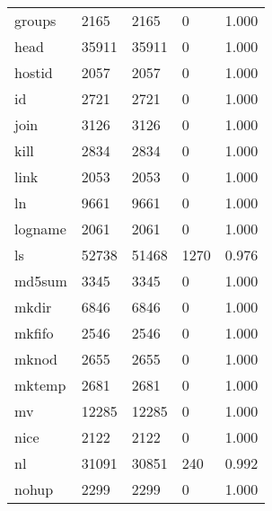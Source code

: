 \begin{longtable}{lp{3.0cm}p{3.0cm}p{3.0cm}p{3.0cm}}
groups    &                     2165 &         2165 &             0 &                    1.000 \\
head      &                    35911 &        35911 &             0 &                    1.000 \\
hostid    &                     2057 &         2057 &             0 &                    1.000 \\
id        &                     2721 &         2721 &             0 &                    1.000 \\
join      &                     3126 &         3126 &             0 &                    1.000 \\
kill      &                     2834 &         2834 &             0 &                    1.000 \\
link      &                     2053 &         2053 &             0 &                    1.000 \\
ln        &                     9661 &         9661 &             0 &                    1.000 \\
logname   &                     2061 &         2061 &             0 &                    1.000 \\
ls        &                    52738 &        51468 &          1270 &                    0.976 \\
md5sum    &                     3345 &         3345 &             0 &                    1.000 \\
mkdir     &                     6846 &         6846 &             0 &                    1.000 \\
mkfifo    &                     2546 &         2546 &             0 &                    1.000 \\
mknod     &                     2655 &         2655 &             0 &                    1.000 \\
mktemp    &                     2681 &         2681 &             0 &                    1.000 \\
mv        &                    12285 &        12285 &             0 &                    1.000 \\
nice      &                     2122 &         2122 &             0 &                    1.000 \\
nl        &                    31091 &        30851 &           240 &                    0.992 \\
nohup     &                     2299 &         2299 &             0 &                    1.000 \\

\end{longtable}
